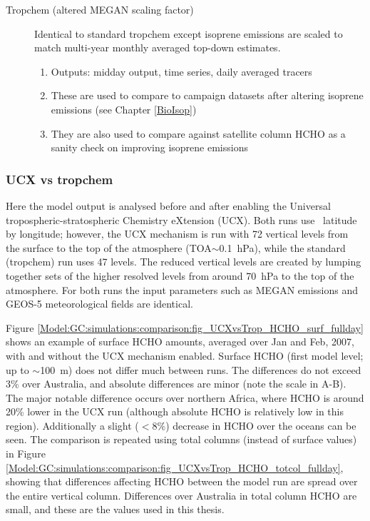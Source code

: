 \begin{description}
        \item [Tropchem (altered MEGAN scaling factor)]%
          Identical to standard tropchem except isoprene emissions are scaled to match multi-year monthly averaged top-down estimates.
          \begin{enumerate}
            \item Outputs: midday output, time series, daily averaged tracers
            \item These are used to compare to campaign datasets after altering isoprene emissions (see Chapter \ref{BioIsop})
            \item They are also used to compare against satellite column HCHO as a sanity check on improving isoprene emissions
          \end{enumerate}
      \end{description}

    \subsubsection{UCX vs tropchem}
      \label{Model:GC:simulations:comparison}
      
      Here the model output is analysed before and after enabling the Universal tropospheric-stratospheric Chemistry eXtension (UCX).
      Both runs use \lowhr ~latitude by longitude; however, the UCX mechanism is run with 72 vertical levels from the surface to the top of the atmosphere (TOA$\sim$0.1~hPa), while the standard (tropchem) run uses 47 levels.
      The reduced vertical levels are created by lumping together sets of the higher resolved levels from around 70~hPa to the top of the atmosphere.
      For both runs the input parameters such as MEGAN emissions and GEOS-5 meteorological fields are identical.
      
      Figure \ref{Model:GC:simulations:comparison:fig_UCXvsTrop_HCHO_surf_fullday} shows an example of surface HCHO amounts, averaged over Jan and Feb, 2007, with and without the UCX mechanism enabled.
      Surface HCHO (first model level; up to $\sim$100~m) does not differ much between runs.
      The differences do not exceed 3\% over Australia, and absolute differences are minor (note the scale in A-B).
      The major notable difference occurs over northern Africa, where HCHO is around 20\% lower in the UCX run (although absolute HCHO is relatively low in this region).
      Additionally a slight ($<8\%$) decrease in HCHO over the oceans can be seen.
      The comparison is repeated using total columns (instead of surface values) in Figure \ref{Model:GC:simulations:comparison:fig_UCXvsTrop_HCHO_totcol_fullday}, showing that differences affecting HCHO between the model run are spread over the entire vertical column.
      Differences over Australia in total column HCHO are small, and these are the values used in this thesis.
      
